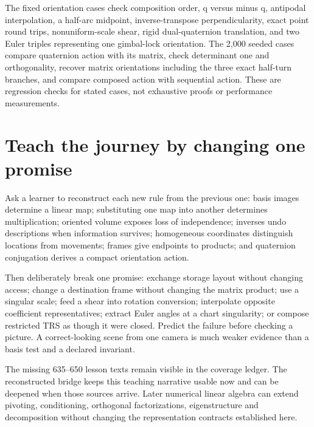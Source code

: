 The fixed orientation cases check composition order, q versus minus q, antipodal interpolation, a half-arc midpoint, inverse-transpose perpendicularity, exact point round trips, nonuniform-scale shear, rigid dual-quaternion translation, and two Euler triples representing one gimbal-lock orientation. The 2,000 seeded cases compare quaternion action with its matrix, check determinant one and orthogonality, recover matrix orientations including the three exact half-turn branches, and compare composed action with sequential action. These are regression checks for stated cases, not exhaustive proofs or performance measurements.

\section{Teach the journey by changing one promise}\label{02-foundations-ii-ch038-teach-the-journey-by-changing-one-promise}

\hypertarget{02-foundations-ii-ch038-teach-the-journey-by-changing-one-promise}{}

Ask a learner to reconstruct each new rule from the previous one: basis images determine a linear map; substituting one map into another determines multiplication; oriented volume exposes loss of independence; inverses undo descriptions when information survives; homogeneous coordinates distinguish locations from movements; frames give endpoints to products; and quaternion conjugation derives a compact orientation action.

Then deliberately break one promise: exchange storage layout without changing access; change a destination frame without changing the matrix product; use a singular scale; feed a shear into rotation conversion; interpolate opposite coefficient representatives; extract Euler angles at a chart singularity; or compose restricted TRS as though it were closed. Predict the failure before checking a picture. A correct-looking scene from one camera is much weaker evidence than a basis test and a declared invariant.

The missing 635--650 lesson texts remain visible in the coverage ledger. The reconstructed bridge keeps this teaching narrative usable now and can be deepened when those sources arrive. Later numerical linear algebra can extend pivoting, conditioning, orthogonal factorizations, eigenstructure and decomposition without changing the representation contracts established here.

